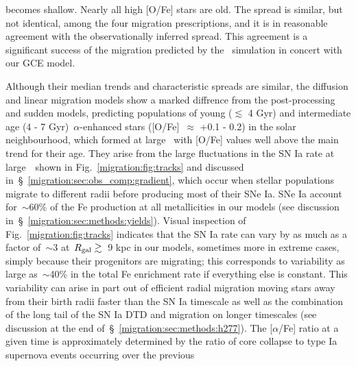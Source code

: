 becomes shallow. 
Nearly all high [O/Fe] stars are old. 
The spread is similar, but not identical, among the four migration 
prescriptions, and it is in reasonable agreement with the observationally 
inferred spread. 
This agreement is a significant success of the migration predicted by the
\hsim~simulation in concert with our GCE model. 
\par 
Although their median trends and characteristic spreads are similar, the 
diffusion and linear migration models show a marked diffrence from the 
post-processing and sudden models, predicting populations of young 
($\lesssim$ 4 Gyr) and intermediate age (4 - 7 Gyr)~$\alpha$-enhanced stars 
([O/Fe]~$\approx$ +0.1 - 0.2) in the solar neighbourhood, which formed at large 
\rgal~with [O/Fe] values well above the main trend for their age. 
They arise from the large fluctuations in the SN Ia rate at large~\rgal~shown 
in Fig.~\ref{migration:fig:tracks} and discussed in~\S~\ref{migration:sec:obs_comp:gradient}, 
which occur when stellar populations migrate to different radii before 
producing most of their SNe Ia. 
SNe Ia account for~$\sim$60\% of the Fe production at all metallicities 
in our models (see discussion in~\S~\ref{migration:sec:methods:yields}). 
Visual inspection of Fig.~\ref{migration:fig:tracks} indicates that the SN Ia rate can 
vary by as much as a factor of~$\sim$3 at~$R_\text{gal}\gtrsim$~9 kpc in our models, 
sometimes more in extreme cases, simply because their progenitors are 
migrating; this corresponds to variability as large as~$\sim$40\% in the total 
Fe enrichment rate if everything else is constant. 
This variability can arise in part out of efficient radial migration moving 
stars away from their birth radii faster than the SN Ia timescale as well as 
the combination of the long tail of the SN Ia DTD and migration on longer 
timescales (see discussion at the end of~\S~\ref{migration:sec:methods:h277}). 
The [$\alpha$/Fe] ratio at a given time is approximately determined by the 
ratio of core collapse to type Ia supernova events occurring over the previous 
